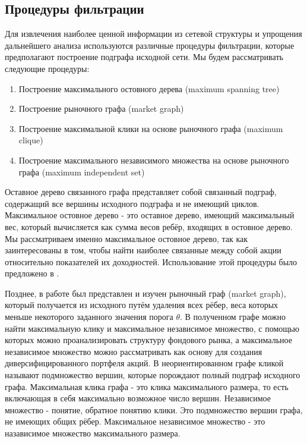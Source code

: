 \subsection{Процедуры фильтрации}

Для извлечения наиболее ценной информации из сетевой структуры и упрощения дальнейшего анализа используются различные процедуры фильтрации, которые предполагают построение подграфа исходной сети. Мы будем рассматривать следующие процедуры:

\begin{enumerate}
	\item Построение максимального остовного дерева (maximum spanning tree)
	\item Построение рыночного графа (market graph)
	\item Построение максимальной клики на основе рыночного графа (maximum clique)
	\item Построение максимального независимого множества на основе рыночного графа (maximum independent set)
\end{enumerate}

Оставное дерево связанного графа представляет собой связанный подграф, содержащий все вершины исходного подграфа и не имеющий циклов.  Максимальное остовное дерево - это оставное дерево, имеющий максимальный вес, который вычисляется как сумма весов ребёр, входящих в остовное дерево. Мы рассматриваем именно максимальное остовное дерево, так как заинтересованы в том, чтобы найти наиболее связанные между собой акции относительно показателей их доходностей. Использование этой процедуры было предложено в \cite{mst2}.

Позднее, в работе \cite{mg} был представлен и изучен рыночный граф (market graph), который получается из исходного путём удаления всех рёбер, веса которых меньше некоторого заданного значения порога $\theta$. В полученном графе можно найти максимальную клику и максимальное независимое множество, с помощью которых можно проанализировать структуру фондового рынка, а максимальное независимое множество можно рассматривать как основу для создания диверсифицированного портфеля акций. В неориентированном графе кликой называют подмножество вершин, которые порождают полный подграф исходного графа. Максимальная клика графа - это клика максимального размера, то есть включающая в себя максимально возможное число вершин. Независимое множество - понятие, обратное понятию клики. Это подмножество вершин графа, не имеющих общих рёбер. Максимальное независимое множество - это назависимое множество максимального размера.

